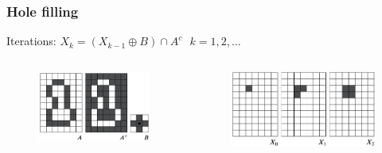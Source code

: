 \begin{frame}
\frametitle{Hole filling}
Iterations:
$X_{k} = \left ( X_{k-1} \oplus B \right ) \cap A^{c}\ \ \ k=1,2,\ldots$
\begin{columns}
\begin{column}{.45\textwidth}
\begin{figure}[!h]
\includegraphics[width=\textwidth]{fig-9-15abc.png}
\end{figure}
\end{column}
\begin{column}{.55\textwidth}
\begin{figure}[!h]
\includegraphics[width=\textwidth]{fig-9-15def.png}
\end{figure}
\end{column}
\end{columns}
\end{frame}

